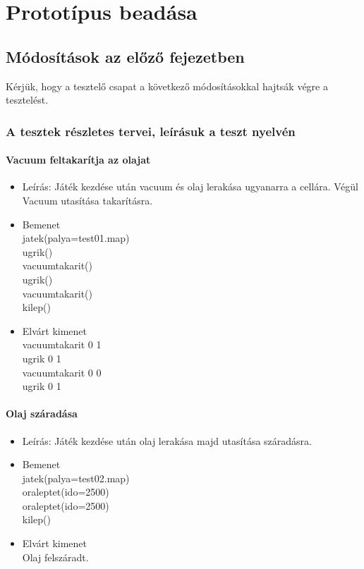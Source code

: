 %
\chapter{Prototípus beadása}

\thispagestyle{fancy}

\setcounter{section}{-1}

\section{Módosítások az előző fejezetben}
Kérjük, hogy a tesztelő csapat a következő módosításokkal hajtsák végre a tesztelést.

\subsection{A tesztek részletes tervei, leírásuk a teszt nyelvén}

\subsubsection{Vacuum feltakarítja az olajat}
\begin{itemize}
	\item Leírás: Játék kezdése után vacuum és olaj lerakása ugyanarra a cellára. Végül Vacuum utasítása takarításra.
	\item Bemenet\\
    jatek(palya=test01.map) \\
    ugrik() \\
    vacuumtakarit() \\
    ugrik() \\
    vacuumtakarit() \\
    kilep() \\
	\item Elvárt kimenet\\
    vacuumtakarit 0 1 \\
    ugrik 0 1 \\
    vacuumtakarit 0 0 \\
    ugrik 0 1 \\
\end{itemize}

\subsubsection{Olaj száradása}
\begin{itemize}
	\item Leírás: Játék kezdése után olaj lerakása majd utasítása száradásra.
	\item Bemenet\\
    jatek(palya=test02.map) \\
    oraleptet(ido=2500) \\
    oraleptet(ido=2500) \\
    kilep() \\
	\item Elvárt kimenet\\
    Olaj felszáradt.\\
\end{itemize}

